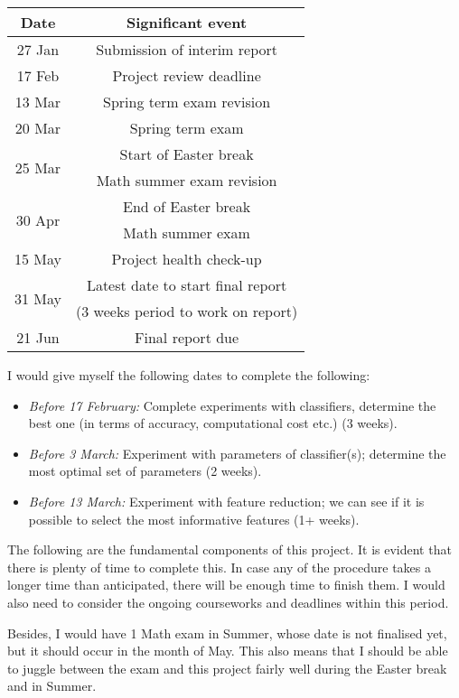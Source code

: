 \documentclass[12pt, twoside, a4paper]{article}
\begin{document}
\begin{center}
    \begin{tabular}{ | c | c |}
    \hline
    Date & Significant event \\ \hline \hline
    27 Jan & Submission of interim report \\ \hline
    17 Feb & Project review deadline \\ \hline \hline
    13 Mar & Spring term exam revision \\ \hline
    20 Mar & Spring term exam \\ \hline \hline
    \multirow{2}{*}{25 Mar} & Start of Easter break \\
    & Math summer exam revision \\ \hline
    \multirow{2}{*}{30 Apr} & End of Easter break \\
     & Math summer exam \\ \hline \hline
    15 May & Project health check-up \\ \hline
    \multirow{2}{*}{31 May} & Latest date to start final report \\
    & (3 weeks period to work on report) \\ \hline
    21 Jun & Final report due \\
    \hline
    \end{tabular}
\end{center}

I would give myself the following dates to complete the following:
\begin{itemize}
\item \textit{Before 17 February:} Complete experiments with classifiers, determine the best one (in terms of accuracy, computational cost etc.) (3 weeks).
\item \textit{Before 3 March:} Experiment with parameters of classifier(s); determine the most optimal set of parameters (2 weeks).
\item \textit{Before 13 March:} Experiment with feature reduction; we can see if it is possible to select the most informative features (1+ weeks).
\end{itemize}

The following are the fundamental components of this project. It is evident that there is plenty of time to complete this. In case any of the procedure takes a longer time than anticipated, there will be enough time to finish them. I would also need to consider the ongoing courseworks and deadlines within this period.

Besides, I would have 1 Math exam in Summer, whose date is not finalised yet, but it should occur in the month of May. This also means that I should be able to juggle between the exam and this project fairly well during the Easter break and in Summer.
\end{document}
